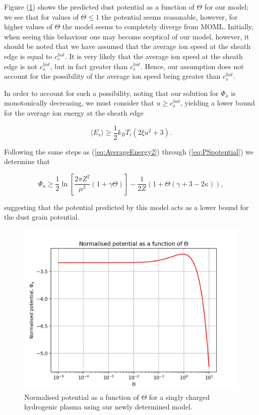 \documentclass{article}
\begin{document}
Figure (\ref{FSpotential}) shows the predicted dust potential as a function of $\Theta$ for 
our model; we see that for values of $\Theta \leq 1$ the potential seems reasonable, however, for higher
values of $\Theta$ the model seems to completely diverge from MOML. Initially, when seeing this behaviour 
one may become sceptical of our model, however, it should be noted that we have assumed that the average ion speed at
the sheath edge is equal to $c_s^{hot}$. It is very likely that the average ion
speed at the sheath edge is not $c_s^{hot}$, but in fact greater than $c_s^{hot}$. Hence, our assumption does not account for the possibility of the average ion 
speed being greater than $c_s^{hot}$. 

\medskip

In order to account for such a possibility, noting that our solution
for $\Phi_a$ is monotonically decreasing, we must consider that
$u \geq c_s^{hot}$, yielding a lower bound for the average ion energy at the sheath edge

\begin{equation}\label{eq:AverageEnergy}
\langle E_{s} \rangle \geq \frac{1}{2}k_B T_i \left(2\xi u^2 + 3\right).
\end{equation}

\medskip

Following the same steps as (\ref{eq:AverageEnergy2}) through (\ref{eq:PSpotential}) we determine that

\begin{equation}\label{eq:LowerBound}
\Phi_a \geq  \frac{1}{2}\ln{\left[\frac{2\pi Z^2}{\mu^2}(1 + \gamma \Theta)\right]} - \frac{1}{2Z}\left(1 + \Theta\left(\gamma + 3 -2\kappa\right)\right),
\end{equation}

\noindent suggesting that the potential predicted by this model acts as a lower bound for the dust grain potential.

\begin{figure}[H]
\centering
\includegraphics[width=\linewidth]{Output/FSpotential.jpeg}
\caption{Normalised potential as a function of $\Theta$ for a singly charged hydrogenic plasma
using our newly determined model.}
\label{FSpotential} 
\end{figure}
\end{document}
